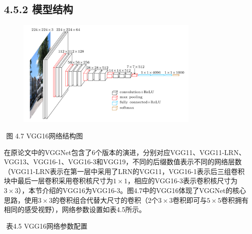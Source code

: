 \subsection{4.5.2 模型结构}\label{ux6a21ux578bux7ed3ux6784-4}

\begin{figure}
\centering
\includegraphics[width=0.8\textwidth]{./img/ch4/vgg16.png}
\caption{}
\end{figure}

​ 图 4.7 VGG16网络结构图

​
在原论文中的VGGNet包含了6个版本的演进，分别对应VGG11、VGG11-LRN、VGG13、VGG16-1、VGG16-3和VGG19，不同的后缀数值表示不同的网络层数（VGG11-LRN表示在第一层中采用了LRN的VGG11，VGG16-1表示后三组卷积块中最后一层卷积采用卷积核尺寸为\(1\times1\)，相应的VGG16-3表示卷积核尺寸为\(3\times3\)），本节介绍的VGG16为VGG16-3。图4.7中的VGG16体现了VGGNet的核心思路，使用\(3\times3\)的卷积组合代替大尺寸的卷积（2个\(3\times3卷积即可与\)\(5\times5\)卷积拥有相同的感受视野），网络参数设置如表4.5所示。

​ 表4.5 VGG16网络参数配置

